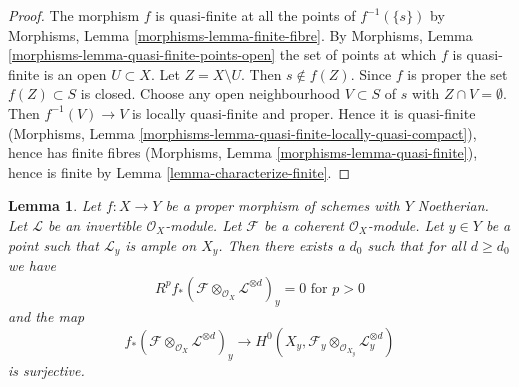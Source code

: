 \documentclass{stacks-project}
\theoremstyle{plain}
\newtheorem{lemma}[subsection]{Lemma}
\theoremstyle{definition}
\theoremstyle{remark}
\numberwithin{equation}{subsection}
\begin{document}
\begin{proof}
The morphism $f$ is quasi-finite at all the points of $f^{-1}(\{s\})$
by Morphisms, Lemma \ref{morphisms-lemma-finite-fibre}.
By Morphisms, Lemma \ref{morphisms-lemma-quasi-finite-points-open} the
set of points at which $f$ is quasi-finite is an open $U \subset X$.
Let $Z = X \setminus U$. Then $s \not \in f(Z)$. Since $f$ is proper
the set $f(Z) \subset S$ is closed. Choose any open neighbourhood
$V \subset S$ of $s$ with $Z \cap V = \emptyset$. Then
$f^{-1}(V) \to V$ is locally quasi-finite and proper.
Hence it is quasi-finite
(Morphisms, Lemma \ref{morphisms-lemma-quasi-finite-locally-quasi-compact}),
hence has finite fibres
(Morphisms, Lemma \ref{morphisms-lemma-quasi-finite}), hence
is finite by Lemma \ref{lemma-characterize-finite}.
\end{proof}

\begin{lemma}
\label{lemma-ample-on-fibre}
Let $f : X \to Y$ be a proper morphism of schemes with $Y$ Noetherian.
Let $\mathcal{L}$ be an invertible $\mathcal{O}_X$-module.
Let $\mathcal{F}$ be a coherent $\mathcal{O}_X$-module.
Let $y \in Y$ be a point such that $\mathcal{L}_y$ is ample on $X_y$.
Then there exists a $d_0$ such that for all $d \geq d_0$ we have
$$
R^pf_*(\mathcal{F} \otimes_{\mathcal{O}_X} \mathcal{L}^{\otimes d})_y = 0
\text{ for }p > 0
$$
and the map
$$
f_*(\mathcal{F} \otimes_{\mathcal{O}_X} \mathcal{L}^{\otimes d})_y
\longrightarrow
H^0(X_y, \mathcal{F}_y \otimes_{\mathcal{O}_{X_y}} \mathcal{L}_y^{\otimes d})
$$
is surjective.
\end{lemma}
\end{document}
